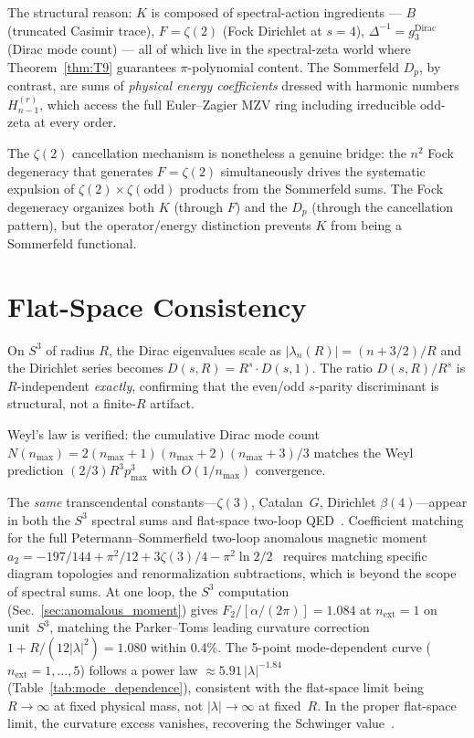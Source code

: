 \documentclass[11pt]{article}
\begin{document}
The structural reason: $K$ is composed of spectral-action ingredients ---
$B$ (truncated Casimir trace), $F = \zeta(2)$ (Fock Dirichlet at $s = 4$),
$\Delta^{-1} = g_3^{\text{Dirac}}$ (Dirac mode count) --- all of which
live in the spectral-zeta world where Theorem~\ref{thm:T9} guarantees
$\pi$-polynomial content.  The Sommerfeld $D_p$, by contrast, are sums of
\emph{physical energy coefficients} dressed with harmonic numbers
$H_{n-1}^{(r)}$, which access the full Euler--Zagier MZV ring including
irreducible odd-zeta at every order.

The $\zeta(2)$ cancellation mechanism is nonetheless a genuine bridge:
the $n^2$ Fock degeneracy that generates $F = \zeta(2)$ simultaneously
drives the systematic expulsion of $\zeta(2) \times \zeta(\text{odd})$
products from the Sommerfeld sums.  The Fock degeneracy organizes both
$K$ (through $F$) and the $D_p$ (through the cancellation pattern),
but the operator/energy distinction prevents $K$ from being a
Sommerfeld functional.

\section{Flat-Space Consistency}
\label{sec:flat_space}

On $S^3$ of radius $R$, the Dirac eigenvalues scale as
$|\lambda_n(R)| = (n + 3/2)/R$ and the Dirichlet series becomes
$D(s, R) = R^s \cdot D(s, 1)$.  The ratio $D(s,R)/R^s$ is
$R$-independent \emph{exactly}, confirming that the even/odd
$s$-parity discriminant is structural, not a finite-$R$ artifact.

Weyl's law is verified: the cumulative Dirac mode count
$N(n_{\max}) = 2(n_{\max}+1)(n_{\max}+2)(n_{\max}+3)/3$ matches the
Weyl prediction $(2/3)R^3 p_{\max}^3$ with $O(1/n_{\max})$
convergence.

The \emph{same} transcendental constants---$\zeta(3)$, Catalan~$G$,
Dirichlet $\beta(4)$---appear in both the $S^3$ spectral sums and
flat-space two-loop QED~\cite{rosner1967,laporta1996}.
Coefficient matching for the full Petermann--Sommerfield two-loop
anomalous magnetic moment $a_2 = -197/144 + \pi^2/12 + 3\zeta(3)/4 -
\pi^2\ln 2/2$~\cite{petermann1957,sommerfield1957} requires matching
specific diagram topologies and renormalization subtractions, which is
beyond the scope of spectral sums.  At one loop, the $S^3$
computation (Sec.~\ref{sec:anomalous_moment}) gives
$F_2/[\alpha/(2\pi)] = 1.084$ at $n_{\mathrm{ext}} = 1$ on unit~$S^3$,
matching the Parker--Toms leading curvature correction
$1 + R/(12|\lambda|^2) = 1.080$ within 0.4\%.  The 5-point
mode-dependent curve ($n_{\mathrm{ext}} = 1, \ldots, 5$) follows
a power law $\approx 5.91\,|\lambda|^{-1.84}$
(Table~\ref{tab:mode_dependence}), consistent with the flat-space
limit being $R \to \infty$ at fixed physical mass, not
$|\lambda| \to \infty$ at fixed~$R$.  In the proper flat-space limit,
the curvature excess vanishes, recovering the Schwinger
value~\cite{schwinger1948}.
\end{document}
